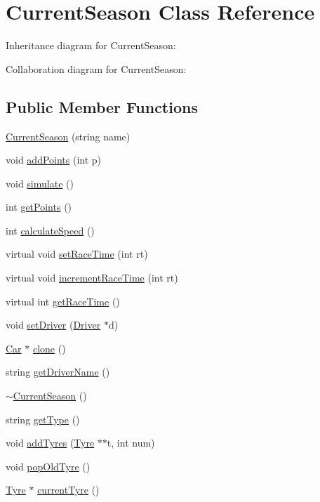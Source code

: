 \hypertarget{classCurrentSeason}{}\section{Current\+Season Class Reference}
\label{classCurrentSeason}


Inheritance diagram for Current\+Season\+:


Collaboration diagram for Current\+Season\+:
\subsection*{Public Member Functions}
\begin{DoxyCompactItemize}
\item 
\hyperlink{classCurrentSeason_a65af23c148bf8745199232459753955f}{Current\+Season} (string name)
\item 
void \hyperlink{classCurrentSeason_a2ae9598222bc7aba71040775c019f297}{add\+Points} (int p)
\item 
void \hyperlink{classCurrentSeason_a4828aaa2c0b914b55ebb34c0d1062e8e}{simulate} ()
\item 
int \hyperlink{classCurrentSeason_acea90ff7b0349785b189199d76b9a9a0}{get\+Points} ()
\item 
int \hyperlink{classCurrentSeason_af605da3db8d851b07265951e5945669c}{calculate\+Speed} ()
\item 
virtual void \hyperlink{classCurrentSeason_aae01cbd64006ce4fe60ea337b4f02962}{set\+Race\+Time} (int rt)
\item 
virtual void \hyperlink{classCurrentSeason_a58d31e4029253b1c244ee44f0052916f}{increment\+Race\+Time} (int rt)
\item 
virtual int \hyperlink{classCurrentSeason_a15328f2c4192d344e970ce111a96946f}{get\+Race\+Time} ()
\item 
void \hyperlink{classCurrentSeason_a3ea9de8713c6d2c21202351b036af75f}{set\+Driver} (\hyperlink{classDriver}{Driver} $\ast$d)
\item 
\hyperlink{classCar}{Car} $\ast$ \hyperlink{classCurrentSeason_afaed34051750fdd603784e6ea7809075}{clone} ()
\item 
string \hyperlink{classCurrentSeason_a3b8912ef6e838fe0a4d735ffc4cd7b66}{get\+Driver\+Name} ()
\item 
\hyperlink{classCurrentSeason_a5f5b214667194da480939a33ada4efae}{$\sim$\+Current\+Season} ()
\item 
string \hyperlink{classCurrentSeason_abeb85d64969c9fd4945bf64ab0464ccd}{get\+Type} ()
\item 
void \hyperlink{classCurrentSeason_a62e6e6c10c5490084230d4c3722196e5}{add\+Tyres} (\hyperlink{classTyre}{Tyre} $\ast$$\ast$t, int num)
\item 
void \hyperlink{classCurrentSeason_a4d58f649f43cc8ea8c1e7e0745b7dc1f}{pop\+Old\+Tyre} ()
\item 
\hyperlink{classTyre}{Tyre} $\ast$ \hyperlink{classCurrentSeason_a9ea661b3a870ecb22026d9a3c7343a8f}{current\+Tyre} ()
\end{DoxyCompactItemize}


